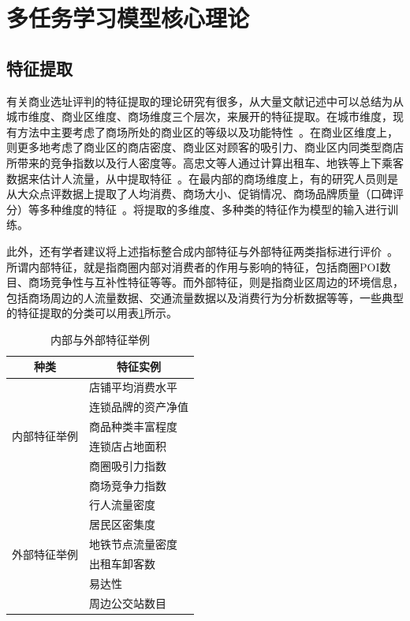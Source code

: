 \documentclass{llncs}
\begin{document}
\section{多任务学习模型核心理论}
\subsection{特征提取}
有关商业选址评判的特征提取的理论研究有很多，从大量文献记述中可以总结为从城市维度、商业区维度、商场维度三个层次，来展开的特征提取。在城市维度，现有方法中主要考虑了商场所处的商业区的等级以及功能特性~\cite{cityLevel}。在商业区维度上，则更多地考虑了商业区的商店密度、商业区对顾客的吸引力、商业区内同类型商店所带来的竞争指数以及行人密度等。高忠文等人通过计算出租车、地铁等上下乘客数据来估计人流量，从中提取特征~\cite{traffic}。在最内部的商场维度上，有的研究人员则是从大众点评数据上提取了人均消费、商场大小、促销情况、商场品牌质量（口碑评分）等多种维度的特征~\cite{mallLevel}。将提取的多维度、多种类的特征作为模型的输入进行训练。

此外，还有学者建议将上述指标整合成内部特征与外部特征两类指标进行评价~\cite{IEfeatures}。所谓内部特征，就是指商圈内部对消费者的作用与影响的特征，包括商圈POI数目、商场竞争性与互补性特征等等。而外部特征，则是指商业区周边的环境信息，包括商场周边的人流量数据、交通流量数据以及消费行为分析数据等等，一些典型的特征提取的分类可以用表\ref{feature}所示。

\begin{table}
	\centering
	\caption{内部与外部特征举例}
	\label{feature}
	\begin{tabular}{c|p{8cm}<{\centering}}
		\hline
		\textbf{种类}  & \multicolumn{1}{c}{\textbf{特征实例}}         \\ \hline
		\multirow{6}{*}{内部特征举例} & 店铺平均消费水平 \\ \cline{2-2} 
		                              & 连锁品牌的资产净值 \\ \cline{2-2}
		                              & 商品种类丰富程度   \\ \cline{2-2}
		                              & 连锁店占地面积   \\ \cline{2-2}
		                              & 商圈吸引力指数  \\ \cline{2-2}
									 & 商场竞争力指数   \\ \hline \hline
		\multirow{6}{*}{外部特征举例} & 行人流量密度   \\ \cline{2-2}
									 & 居民区密集度   \\ \cline{2-2}
									 & 地铁节点流量密度   \\ \cline{2-2}
									 & 出租车卸客数   \\ \cline{2-2}
		                             & 易达性       \\ \cline{2-2}
		                             & 周边公交站数目 \\ \hline
	\end{tabular}
\end{table}
\end{document}
